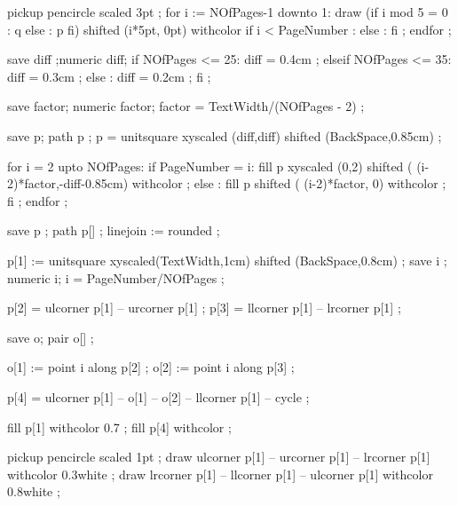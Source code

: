 pickup pencircle scaled 3pt ;
for i := NOfPages-1 downto 1:
  draw (if i mod 5 = 0 : q else : p fi)
       shifted (i*5pt, 0pt)
       withcolor if i < PageNumber :  
                 else :              
                 fi ;
endfor ;
\stopuseMPgraphic

save diff ;numeric diff; 
if NOfPages <= 25:
	diff = 0.4cm ;
elseif NOfPages <= 35:
	diff = 0.3cm ;
else :
	diff = 0.2cm ;
fi ;

save factor; numeric factor; 
factor = TextWidth/(NOfPages - 2) ;

save p; path p ;
p = unitsquare xyscaled (diff,diff) 
               shifted (BackSpace,0.85cm) ;

for i = 2 upto NOfPages:
  if PageNumber = i:
    fill p xyscaled (0,2) shifted ( (i-2)*factor,-diff-0.85cm) 
         withcolor  ;
  else :
    fill p shifted ( (i-2)*factor, 0) 
         withcolor  ;
  fi ;
endfor ;
\stopuseMPgraphic 

save p ;
path p[] ;
linejoin := rounded ;

p[1] := unitsquare xyscaled(TextWidth,1cm) shifted (BackSpace,0.8cm) ;
save i ;
numeric i; 
i = PageNumber/NOfPages ;

p[2] = ulcorner p[1] -- urcorner p[1] ;
p[3] = llcorner p[1] -- lrcorner p[1] ;

save o;
pair o[] ;

o[1] := point i along p[2] ;
o[2] := point i along p[3] ;

p[4] = ulcorner p[1] -- o[1] -- o[2] -- llcorner p[1] -- cycle ;

fill p[1] withcolor 0.7 ;
fill p[4] withcolor  ;

pickup pencircle scaled 1pt ;
draw ulcorner p[1] -- urcorner p[1] -- lrcorner p[1] withcolor 0.3white ;
draw lrcorner p[1] -- llcorner p[1] -- ulcorner p[1] withcolor 0.8white ;


% 
% 
% 
% 
% 
\stopuseMPgraphic

\protect

\stopmodule
